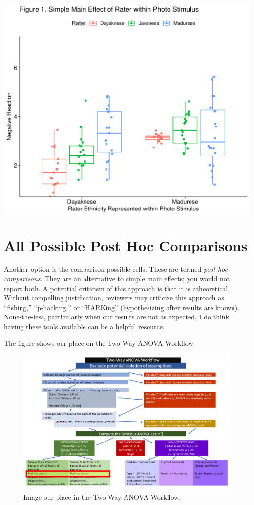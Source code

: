 \documentclass[
  11pt,
]{book}
\begin{document}
\includegraphics{13-moReTwoWay_files/figure-latex/unnamed-chunk-19-1.pdf}

\hypertarget{all-possible-post-hoc-comparisons}{%
\section*{All Possible Post Hoc Comparisons}\label{all-possible-post-hoc-comparisons}}


Another option is the comparison possible cells. These are termed \emph{post hoc comparisons.} They are an alternative to simple main effects; you would not report both. A potential criticism of this approach is that it is atheoretical. Without compelling justification, reviewers may criticize this approach as ``fishing,'' ``p-hacking,'' or ``HARKing'' (hypothesizing after results are known). None-the-less, particularly when our results are not as expected, I do think having these tools available can be a helpful resource.

The figure shows our place on the Two-Way ANOVA Workflow.

\begin{figure}
\centering
\includegraphics{images/factorial/WrkFlw_IntPH.jpg}
\caption{Image our place in the Two-Way ANOVA Workflow.}
\end{figure}
\end{document}
